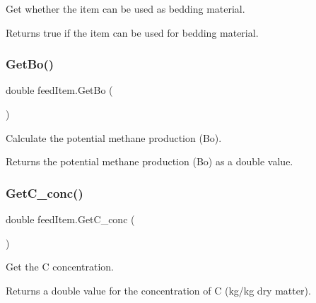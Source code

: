 Get whether the item can be used as bedding material. 

\begin{DoxyReturn}{Returns}
true if the item can be used for bedding material. 
\end{DoxyReturn}
\mbox{\label{classfeed_item_afb82b1257ec3d3e9cb1dedae71273557}} 
\subsubsection{\texorpdfstring{GetBo()}{GetBo()}}
{\footnotesize\ttfamily double feed\+Item.\+Get\+Bo (\begin{DoxyParamCaption}{ }\end{DoxyParamCaption})\hspace{0.3cm}{\ttfamily [inline]}}



Calculate the potential methane production (Bo). 

\begin{DoxyReturn}{Returns}
the potential methane production (Bo) as a double value. 
\end{DoxyReturn}
\mbox{\label{classfeed_item_a9661e73c167e27fd0e1b78fbb9bbe9bc}} 
\subsubsection{\texorpdfstring{GetC\_conc()}{GetC\_conc()}}
{\footnotesize\ttfamily double feed\+Item.\+Get\+C\+\_\+conc (\begin{DoxyParamCaption}{ }\end{DoxyParamCaption})\hspace{0.3cm}{\ttfamily [inline]}}



Get the C concentration. 

\begin{DoxyReturn}{Returns}
a double value for the concentration of C (kg/kg dry matter). 
\end{DoxyReturn}
\mbox{\label{classfeed_item_a1d4a479d20f0a6796825b6a9369b04d7}} 
